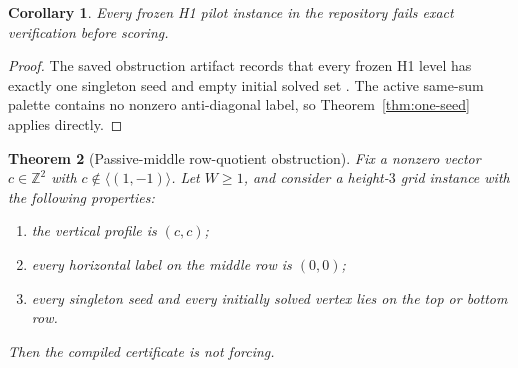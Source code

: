 \documentclass[11pt]{article}
\newtheorem{theorem}{Theorem}
\newtheorem{corollary}[theorem]{Corollary}
\theoremstyle{definition}
\newcommand{\Z}{\mathbb{Z}}
\begin{document}
\begin{corollary}
\label{cor:h1}
Every frozen \textup{\textsc{H1}} pilot instance in the repository fails exact verification before scoring.
\end{corollary}

\begin{proof}
The saved obstruction artifact records that every frozen \textsc{H1} level has exactly one singleton seed and empty initial solved set \citep{archivara_h1_obstruction}. The active same-sum palette contains no nonzero anti-diagonal label, so Theorem~\ref{thm:one-seed} applies directly.
\end{proof}

\begin{theorem}[Passive-middle row-quotient obstruction]
\label{thm:row-quotient}
Fix a nonzero vector $c\in \Z^2$ with $c\notin \langle(1,-1)\rangle$. Let $W\geq 1$, and consider a height-$3$ grid instance with the following properties:
\begin{enumerate}
  \item the vertical profile is $(c,c)$;
  \item every horizontal label on the middle row is $(0,0)$;
  \item every singleton seed and every initially solved vertex lies on the top or bottom row.
\end{enumerate}
Then the compiled certificate is not forcing.
\end{theorem}
\end{document}
